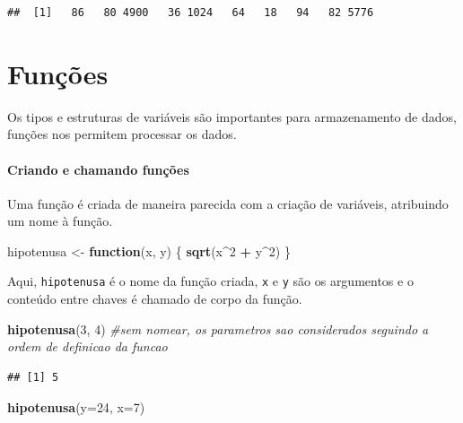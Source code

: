 \documentclass[
]{book}
\newenvironment{Shaded}{\begin{snugshade}}{\end{snugshade}}
\newcommand{\AttributeTok}[1]{\textcolor[rgb]{0.13,0.29,0.53}{#1}}
\newcommand{\CommentTok}[1]{\textcolor[rgb]{0.56,0.35,0.01}{\textit{#1}}}
\newcommand{\ControlFlowTok}[1]{\textcolor[rgb]{0.13,0.29,0.53}{\textbf{#1}}}
\newcommand{\DecValTok}[1]{\textcolor[rgb]{0.00,0.00,0.81}{#1}}
\newcommand{\FunctionTok}[1]{\textcolor[rgb]{0.13,0.29,0.53}{\textbf{#1}}}
\newcommand{\NormalTok}[1]{#1}
\newcommand{\OtherTok}[1]{\textcolor[rgb]{0.56,0.35,0.01}{#1}}
\newcommand{\SpecialCharTok}[1]{\textcolor[rgb]{0.81,0.36,0.00}{\textbf{#1}}}
\begin{document}
\begin{verbatim}
##  [1]   86   80 4900   36 1024   64   18   94   82 5776
\end{verbatim}

\section{Funções}\label{funuxe7uxf5es}

Os tipos e estruturas de variáveis são importantes para armazenamento de dados, funções nos permitem processar os dados.

\paragraph{Criando e chamando funções}\label{criando-e-chamando-funuxe7uxf5es}

Uma função é criada de maneira parecida com a criação de variáveis, atribuindo um nome à função.

\begin{Shaded}
\begin{Highlighting}[]
\NormalTok{hipotenusa }\OtherTok{\textless{}{-}} \ControlFlowTok{function}\NormalTok{(x, y) \{}
  \FunctionTok{sqrt}\NormalTok{(x}\SpecialCharTok{\^{}}\DecValTok{2} \SpecialCharTok{+}\NormalTok{ y}\SpecialCharTok{\^{}}\DecValTok{2}\NormalTok{)}
\NormalTok{\}}
\end{Highlighting}
\end{Shaded}

Aqui, \texttt{hipotenusa} é o nome da função criada, \texttt{x} e \texttt{y} são os argumentos e o conteúdo entre chaves é chamado de corpo da função.

\begin{Shaded}
\begin{Highlighting}[]
\FunctionTok{hipotenusa}\NormalTok{(}\DecValTok{3}\NormalTok{, }\DecValTok{4}\NormalTok{) }\CommentTok{\#sem nomear, os parametros sao considerados seguindo a ordem de definicao da funcao}
\end{Highlighting}
\end{Shaded}

\begin{verbatim}
## [1] 5
\end{verbatim}

\begin{Shaded}
\begin{Highlighting}[]
\FunctionTok{hipotenusa}\NormalTok{(}\AttributeTok{y=}\DecValTok{24}\NormalTok{, }\AttributeTok{x=}\DecValTok{7}\NormalTok{)}
\end{Highlighting}
\end{Shaded}
\end{document}
